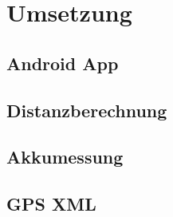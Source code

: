 \clearpage
\section{Umsetzung}
\subsection{Android App}
\subsection{Distanzberechnung}
\subsection{Akkumessung}
\subsection{GPS XML}
